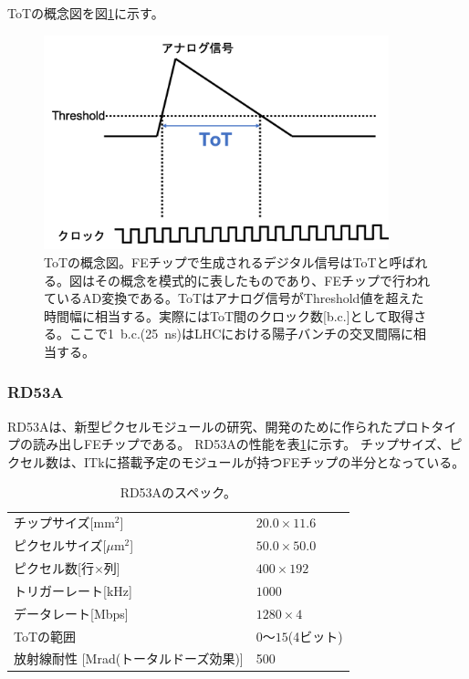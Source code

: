 ToTの概念図を図\ref{tot_algorithm}に示す。

\begin{figure}[bpt]\centering
\includegraphics[width=10cm]{./tot_algorithm.png}
\caption[ToTの概念図]{ToTの概念図。FEチップで生成されるデジタル信号はToTと呼ばれる。図はその概念を模式的に表したものであり、FEチップで行われているAD変換である。ToTはアナログ信号がThreshold値を超えた時間幅に相当する。実際にはToT間のクロック数[b.c.]として取得さる。ここで1~b.c.(25~ns)はLHCにおける陽子バンチの交叉間隔に相当する。}
\label{tot_algorithm}
\end{figure}

\subsubsection{RD53A}
RD53A\cite{2-1}は、新型ピクセルモジュールの研究、開発のために作られたプロトタイプの読み出しFEチップである。
RD53Aの性能を表\ref{rd53a_spec}に示す。
チップサイズ、ピクセル数は、ITkに搭載予定のモジュールが持つFEチップの半分となっている。

\begin{table}[tbp]
\begin{center}
\caption[RD53Aのスペック]{RD53Aのスペック。}
\label{rd53a_spec}
  \begin{tabular}{|ll|} \hline
    チップサイズ[mm$^2$] & $20.0\times 11.6$ \\ 
    ピクセルサイズ[$\mu$m$^2$] & $50.0\times 50.0$ \\ 
    ピクセル数[行$\times$列] & $400\times 192$ \\ 
    トリガーレート[kHz] & $1000$ \\ 
    データレート[Mbps] & $1280\times4$ \\ 
    ToTの範囲 & $0〜15$(4ビット) \\
    放射線耐性 [Mrad(トータルドーズ効果\cite{2-4})] & 500 \\\hline
  \end{tabular}
\end{center}
\end{table}

